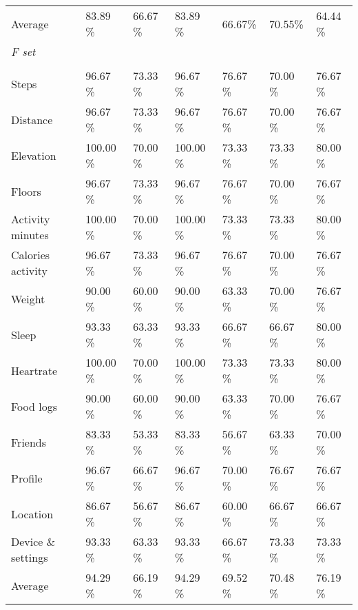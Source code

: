\begin{appendices}
\begin{table*}
\begin{tabular}{P{2.5cm}P{1.7cm}P{1.6cm}P{1.5cm}P{1.5cm}P{1.5cm}P{1.9cm}}
\cmidrule(r){2-7}
Average & 83.89 \% & 66.67 \% & 83.89 \% & 66.67\% & 70.55\% & 64.44 \%\\ 
\cmidrule(r){1-7}
\textit{F set}\\
\\
Steps & 96.67 \% & 73.33 \% &96.67 \%  & 76.67 \%& 70.00 \% & 76.67 \%\\
Distance & 96.67 \% &73.33 \% &96.67 \% & 76.67 \% & 70.00 \%& 76.67 \%\\
Elevation & 100.00 \%&70.00 \% &100.00 \% & 73.33 \% & 73.33 \%& 80.00 \%\\
Floors & 96.67 \%& 73.33 \% &96.67 \% & 76.67 \% & 70.00 \% & 76.67 \%\\
Activity minutes &100.00 \% & 70.00 \% & 100.00 \% & 73.33 \% & 73.33 \% & 80.00 \%\\
Calories activity &96.67 \%&73.33 \% &96.67 \% & 76.67 \% & 70.00 \% & 76.67 \%\\
Weight &90.00 \% &60.00 \% &90.00 \% & 63.33 \% & 70.00 \%& 76.67 \%\\
Sleep &93.33 \% &63.33 \% &93.33 \% & 66.67 \% & 66.67 \% & 80.00 \%\\
Heartrate &100.00 \% &70.00 \% &100.00 \% & 73.33 \% & 73.33 \% & 80.00 \%\\
Food logs &90.00 \% &60.00 \% &90.00 \% & 63.33 \% & 70.00 \%& 76.67 \%\\
Friends &83.33 \% &53.33 \% &83.33 \% & 56.67 \% & 63.33 \% & 70.00 \%\\
Profile &96.67 \% &66.67 \% &96.67 \% & 70.00 \% &76.67 \% & 76.67 \%\\
Location  &86.67 \% &56.67 \% &86.67 \% & 60.00 \% & 66.67 \% & 66.67 \%\\
Device \& settings &93.33 \%  & 63.33 \% &93.33 \% & 66.67 \% & 73.33 \% & 73.33 \%\\

\cmidrule(r){2-7}
Average & 94.29 \%& 66.19 \% & 94.29 \% & 69.52 \% &  70.48 \% & 76.19 \%\\
\cmidrule(r){1-7}


\end{tabular}
\end{table*}
\end{appendices}
